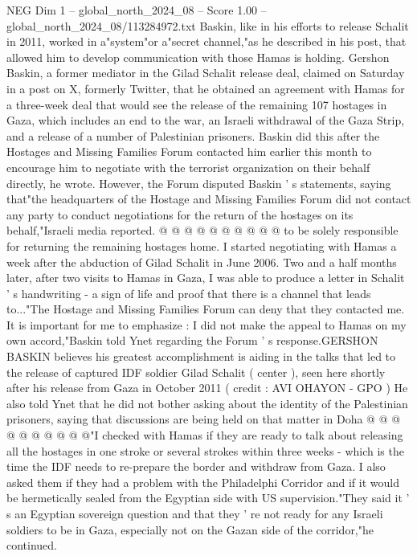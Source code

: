\begin{textsample}{NEG Dim 1 – global\_north\_2024\_08 – Score 1.00 – global\_north\_2024\_08/113284972.txt}  \label{ex:f1_neg_046}
Baskin, like in his efforts to release Schalit in 2011, worked in a"system"or a"secret channel,"as he described in his post, that allowed him to develop communication with those Hamas is holding.
Gershon Baskin, a former mediator in the Gilad Schalit release deal, claimed on Saturday in a post on X, formerly Twitter, that he obtained an agreement with Hamas for a three-week deal that would see the release of the remaining 107 hostages in Gaza, which includes an end to the war, an Israeli withdrawal of the Gaza Strip, and a release of a number of Palestinian prisoners.
Baskin did this after the Hostages and Missing Families Forum contacted him earlier this month to encourage him to negotiate with the terrorist organization on their behalf directly, he wrote.
However, the Forum disputed Baskin ' s statements, saying that"the headquarters of the Hostage and Missing Families Forum did not contact any party to conduct negotiations for the return of the hostages on its behalf,"Israeli media reported. @ @ @ @ @ @ @ @ @ @ to be solely responsible for returning the remaining hostages home.
I started negotiating with Hamas a week after the abduction of Gilad Schalit in June 2006.
Two and a half months later, after two visits to Hamas in Gaza, I was able to produce a letter in Schalit ' s handwriting - a sign of life and proof that there is a channel that leads to..."The Hostage and Missing Families Forum can deny that they contacted me.
It is important for me to emphasize : I did not make the appeal to Hamas on my own accord,"Baskin told Ynet regarding the Forum ' s response.GERSHON BASKIN believes his greatest accomplishment is aiding in the talks that led to the release of captured IDF soldier Gilad Schalit ( center ), seen here shortly after his release from Gaza in October 2011 ( credit : AVI OHAYON - GPO ) He also told Ynet that he did not bother asking about the identity of the Palestinian prisoners, saying that discussions are being held on that matter in Doha @ @ @ @ @ @ @ @ @ @"I checked with Hamas if they are ready to talk about releasing all the hostages in one stroke or several strokes within three weeks - which is the time the IDF needs to re-prepare the border and withdraw from Gaza.
I also asked them if they had a problem with the Philadelphi Corridor and if it would be hermetically sealed from the Egyptian side with US supervision."They said it ' s an Egyptian sovereign question and that they ' re not ready for any Israeli soldiers to be in Gaza, especially not on the Gazan side of the corridor,"he continued.

\end{textsample}
